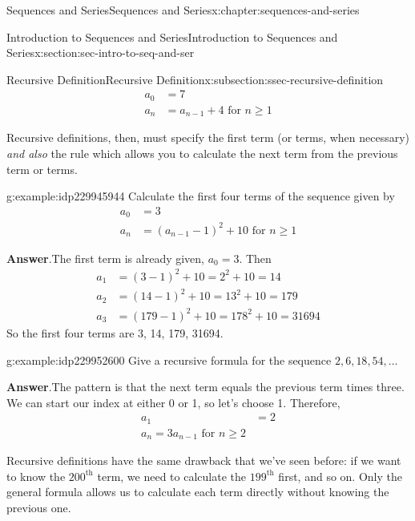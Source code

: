 \documentclass[twoside,10pt,]{book}
\newcommand{\blocktitlefont}{\relax}
\numberwithin{equation}{section}
\newcommand{\upth}[1]{{#1^{\text{th}}}}
\newcommand{\amp}{&}
\begin{document}
\begin{chapterptx}{Sequences and Series}{}{Sequences and Series}{}{}{x:chapter:sequences-and-series}
\begin{sectionptx}{Introduction to Sequences and Series}{}{Introduction to Sequences and Series}{}{}{x:section:sec-intro-to-seq-and-ser}
\begin{subsectionptx}{Recursive Definition}{}{Recursive Definition}{}{}{x:subsection:ssec-recursive-definition}
\begin{align*}
{a_0} \amp = 7\\
{a_n} \amp = {a_{n - 1}} + 4 \text{ for } n \ge 1
\end{align*}
%
\par
Recursive definitions, then, must specify the first term (or terms, when necessary) \emph{and also} the rule which allows you to calculate the next term from the previous term or terms. \begin{example}{}{g:example:idp229945944}%
Calculate the first four terms of the sequence given by%
\begin{align*}
{a_0} \amp = 3\\
{a_n} \amp = {\left( {{a_{n - 1}} - 1} \right)^2} + 10 \text{ for } n \ge 1
\end{align*}
\par\smallskip%
\noindent\textbf{\blocktitlefont Answer}.\label{g:answer:idp229941720}{}\hypertarget{g:answer:idp229941720}{}\quad{}The first term is already given, \(a_0=3\).  Then%
\begin{align*}
{a_1} \amp = {\left( {3 - 1} \right)^2} + 10 = {2^2} + 10 = 14\\
{a_2} \amp = {\left( {14 - 1} \right)^2} + 10 = {13^2} + 10 = 179\\
{a_3} \amp = {\left( {179 - 1} \right)^2} + 10 = {178^2} + 10 = 31694
\end{align*}
So the first four terms are 3, 14, 179, 31694.\end{example}
 \begin{example}{}{g:example:idp229952600}%
Give a recursive formula for the sequence \(2, 6, 18, 54, \ldots\)\par\smallskip%
\noindent\textbf{\blocktitlefont Answer}.\label{g:answer:idp229952472}{}\hypertarget{g:answer:idp229952472}{}\quad{}The pattern is that the next term equals the previous term times three.  We can start our index at either 0 or 1, so let's choose 1.  Therefore,%
\begin{align*}
{a_1} \amp = 2\\
{a_n} = 3{a_{n - 1}} \text{ for } n \ge 2
\end{align*}
\end{example}
%
\par
Recursive definitions have the same drawback that we've seen before:  if we want to know the \(\upth{200}\) term, we need to calculate the \(\upth{199}\) first, and so on.  Only the general formula allows us to calculate each term directly without knowing the previous one.%
\end{subsectionptx}

\end{sectionptx}
\end{chapterptx}
\end{document}
